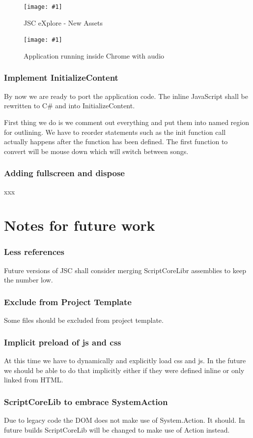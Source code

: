\documentclass[12pt,leqno]{book}
\newcommand{\png}[1]{\texttt{[image: \#1]}}
\newcommand{\figpng}[2]{\begin{figure}[htb]\centering\png{#1}\caption{#2}\end{figure}}
\begin{document}
\figpng{Images/eXplore-2012-03-31_13.48.45}
{JSC eXplore - New Assets}

\figpng{Images/A_string_from_JavaScript._-_Google_Chrome-2012-03-31_13.54.10}
{Application running inside Chrome with audio}

\subsection{Implement InitializeContent}
By now we are ready to port the application code. The inline JavaScript shall be rewritten to C# and into InitializeContent.

First thing we do is we comment out everything and put them into named region for outlining. We have to reorder statements such as the init function call actually happens after the function has been defined. The first function to convert will be mouse down which will switch between songs.


\subsection{Adding fullscreen and dispose}
xxx




\chapter{Notes for future work}

\subsection{Less references}
Future versions of JSC shall consider merging ScriptCoreLibr assemblies to keep the number low.

\subsection{Exclude from Project Template}
Some files should be excluded from project template. 

\subsection{Implicit preload of js and css}
At this time we have to dynamically and explicitly load css and js. In the future we should
be able to do that implicitly either if they were defined inline or only linked from HTML.

\subsection{ScriptCoreLib to embrace SystemAction}
Due to legacy code the DOM does not make use of System.Action. It should. In future builds ScriptCoreLib will be changed to make use of Action instead.
\end{document}
